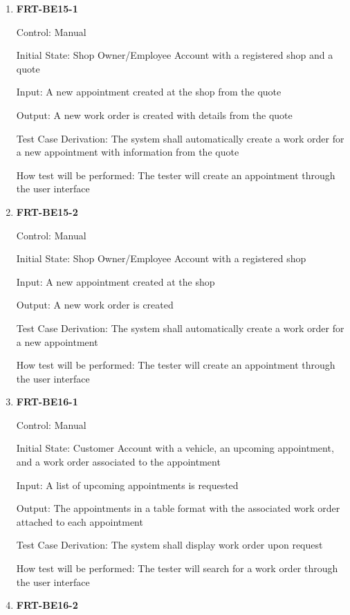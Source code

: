 \documentclass[12pt, titlepage]{article}
\begin{document}
\begin{enumerate}

	\item \textbf{FRT-BE15-1}

	      Control: Manual

	      Initial State: Shop Owner/Employee Account with a registered shop and a quote

	      Input: A new appointment created at the shop from the quote

	      Output: A new work order is created with details from the quote

	      Test Case Derivation: The system shall automatically create a work order for a new appointment with
	      information from the quote

	      How test will be performed: The tester will create an appointment through the user interface

	\item \textbf{FRT-BE15-2}

	      Control: Manual

	      Initial State: Shop Owner/Employee Account with a registered shop

	      Input: A new appointment created at the shop

	      Output: A new work order is created

	      Test Case Derivation: The system shall automatically create a work order for a new appointment

	      How test will be performed: The tester will create an appointment through the user interface

	\item \textbf{FRT-BE16-1}

	      Control: Manual

	      Initial State: Customer Account with a vehicle, an upcoming appointment, and a work order
	      associated to the appointment

	      Input: A list of upcoming appointments is requested

	      Output: The appointments in a table format with the associated work order attached to each
	      appointment

	      Test Case Derivation: The system shall display work order upon request

	      How test will be performed: The tester will search for a work order through the user interface

	\item \textbf{FRT-BE16-2}


\end{enumerate}
\end{document}
